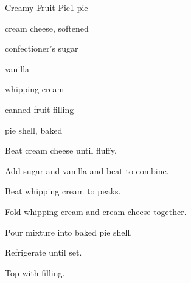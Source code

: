 \begin{recipe}{Creamy Fruit Pie}{}{1 pie}

\begin{ingredients}
\item {} cream cheese, softened
\item {} confectioner's sugar
\item {} vanilla
\item {} whipping cream
\item canned fruit filling
\item pie shell, baked
\end{ingredients}

\begin{directions}
\item Beat cream cheese until fluffy.
\item Add sugar and vanilla and beat to combine.
\item Beat whipping cream to peaks.
\item Fold whipping cream and cream cheese together.
\item Pour mixture into baked pie shell.
\item Refrigerate until set.
\item Top with filling.
\end{directions}

\end{recipe}
